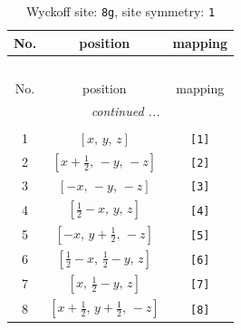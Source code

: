 \documentclass[fleqn,8pt]{jsarticle}
\begin{document}
\renewcommand{\arraystretch}{1.2}
\begin{longtable}{ccc}
\caption{Wyckoff site: {\tt 8g}, site symmetry: {\tt 1}}
 \\
 \hline \hline
No. & position & mapping \\ \hline \endfirsthead

\multicolumn{2}{l}{\tablename\ \thetable{}} \\
 \hline \hline
No. & position & mapping \\ \hline \endhead

 \hline \hline
\multicolumn{2}{r}{\footnotesize\it continued ...} \\ \endfoot

 \hline \hline
\multicolumn{2}{r}{} \\ \endlastfoot

1 & $\left[ x,\, y,\, z \right]$ & {\tt [1]} \\ \hline
2 & $\left[ x + \frac{1}{2},\, - y,\, - z \right]$ & {\tt [2]} \\ \hline
3 & $\left[ - x,\, - y,\, - z \right]$ & {\tt [3]} \\ \hline
4 & $\left[ \frac{1}{2} - x,\, y,\, z \right]$ & {\tt [4]} \\ \hline
5 & $\left[ - x,\, y + \frac{1}{2},\, - z \right]$ & {\tt [5]} \\ \hline
6 & $\left[ \frac{1}{2} - x,\, \frac{1}{2} - y,\, z \right]$ & {\tt [6]} \\ \hline
7 & $\left[ x,\, \frac{1}{2} - y,\, z \right]$ & {\tt [7]} \\ \hline
8 & $\left[ x + \frac{1}{2},\, y + \frac{1}{2},\, - z \right]$ & {\tt [8]} \\
\end{longtable}
\end{document}
